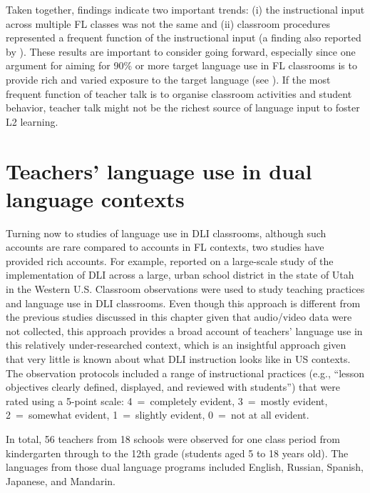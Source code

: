 \documentclass[output=paper,chinesefont]{langscibook}
\begin{document}
Taken together,  findings indicate two important trends: (i) the instructional input across multiple FL classes was not the same and (ii) classroom procedures represented a frequent function of the instructional input (a finding also reported by \citealt{CollinsEtAl2012}). These results are important to consider going forward, especially since one argument for aiming for 90\% or more target language use in FL classrooms is to provide rich and varied exposure to the target language (see \citealt{ACTFL2021}). If the most frequent function of teacher talk is to organise classroom activities and student behavior, teacher talk might not be the richest source of language input to foster L2 learning.

\section{Teachers’ language use in dual language contexts}

Turning now to studies of language use in DLI classrooms, although such accounts are rare compared to accounts in FL contexts, two studies have provided rich accounts. For example, \citet{LiEtAl2016} reported on a large-scale study of the implementation of DLI across a large, urban school district in the state of Utah in the Western U.S. Classroom observations were used to study teaching practices and language use in DLI classrooms. Even though this approach is different from the previous studies discussed in this chapter given that audio/video data were not collected, this approach provides a broad account of teachers’ language use in this relatively under-researched context, which is an insightful approach given that very little is known about what DLI instruction looks like in US contexts. The observation protocols included a range of instructional practices (e.g., ``lesson objectives clearly defined, displayed, and reviewed with students'') that were rated using a 5-point scale: 4~=~completely evident, 3~=~mostly evident, 2~=~somewhat evident, 1~=~slightly evident, 0~=~not at all evident.  

In total, 56 teachers from 18 schools were observed for one class period from kindergarten through to the 12th grade (students aged 5 to 18 years old). The languages from those dual language programs included English, Russian, Spanish, Japanese, and Mandarin.
\end{document}
